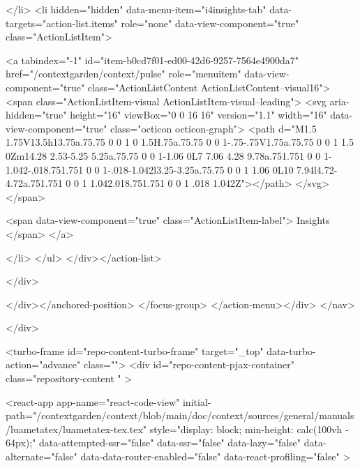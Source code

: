</li>
        <li hidden="hidden" data-menu-item="i4insights-tab" data-targets="action-list.items" role="none" data-view-component="true" class="ActionListItem">
    
    
    <a tabindex="-1" id="item-b0cd7f01-ed00-42d6-9257-7564e4900da7" href="/contextgarden/context/pulse" role="menuitem" data-view-component="true" class="ActionListContent ActionListContent--visual16">
        <span class="ActionListItem-visual ActionListItem-visual--leading">
          <svg aria-hidden="true" height="16" viewBox="0 0 16 16" version="1.1" width="16" data-view-component="true" class="octicon octicon-graph">
    <path d="M1.5 1.75V13.5h13.75a.75.75 0 0 1 0 1.5H.75a.75.75 0 0 1-.75-.75V1.75a.75.75 0 0 1 1.5 0Zm14.28 2.53-5.25 5.25a.75.75 0 0 1-1.06 0L7 7.06 4.28 9.78a.751.751 0 0 1-1.042-.018.751.751 0 0 1-.018-1.042l3.25-3.25a.75.75 0 0 1 1.06 0L10 7.94l4.72-4.72a.751.751 0 0 1 1.042.018.751.751 0 0 1 .018 1.042Z"></path>
</svg>
        </span>
      
        <span data-view-component="true" class="ActionListItem-label">
          Insights
</span>      
</a>
  
</li>
</ul>    
</div></action-list>


</div>
      
</div></anchored-position>  </focus-group>
</action-menu></div>
</nav>

  </div>

  



<turbo-frame id="repo-content-turbo-frame" target="_top" data-turbo-action="advance" class="">
    <div id="repo-content-pjax-container" class="repository-content " >
    



    
      
    








<react-app
  app-name="react-code-view"
  initial-path="/contextgarden/context/blob/main/doc/context/sources/general/manuals/luametatex/luametatex-tex.tex"
    style="display: block; min-height: calc(100vh - 64px);"
  data-attempted-ssr="false"
  data-ssr="false"
  data-lazy="false"
  data-alternate="false"
  data-data-router-enabled="false"
  data-react-profiling="false"
>
  
